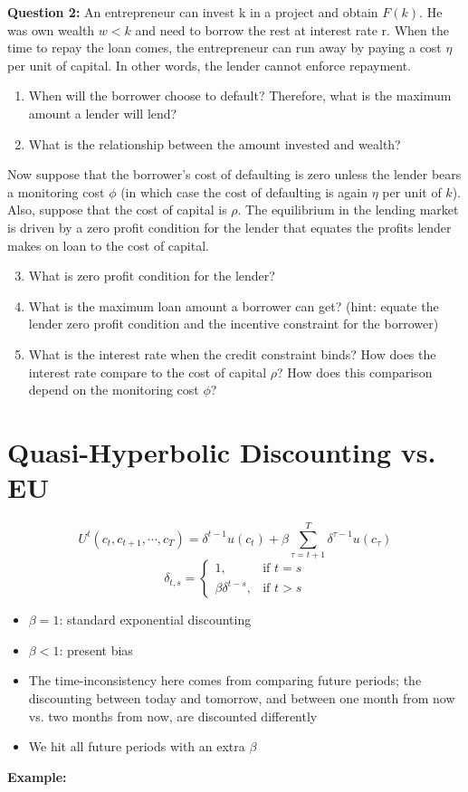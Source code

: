 \documentclass[a4paper]{article}
\begin{document}
\textbf{Question 2:} An entrepreneur can invest k in a project and obtain $F(k)$. He was own wealth $w<k$ and need to borrow the rest at interest rate r. When the time to repay the loan comes, the entrepreneur can run away by paying a cost $\eta$ per unit of capital. In other words, the lender cannot enforce repayment.
\begin{enumerate}
    \item When will the borrower choose to default? Therefore, what is the maximum amount a lender will lend?
    \item What is the relationship between the amount invested and wealth?
\end{enumerate}
Now suppose that the borrower’s cost of defaulting is zero unless the lender bears a monitoring cost $\phi$ (in which case the cost of defaulting is again $\eta$ per unit of $k$). Also, suppose that the cost of capital is $\rho$. The equilibrium in the lending market is driven by a zero profit condition for the lender that equates the profits lender makes on loan to the cost of capital.
\begin{enumerate}
    \setcounter{enumi}{2}
    \item What is zero profit condition for the lender?
    \item What is the maximum loan amount a borrower can get? (hint: equate the lender zero profit condition and the incentive constraint for the borrower)
    \item What is the interest rate when the credit constraint binds? How does the interest rate compare to the cost of capital $\rho$? How does this comparison depend on the monitoring cost $\phi$?
\end{enumerate}

\section{Quasi-Hyperbolic Discounting vs. EU}
\begin{equation*}
    U^t(c_t,c_{t+1},\cdots,c_T)=\delta^{t-1}u(c_t)+\beta\sum_{\tau=t+1}^{T}\delta^{\tau-1}u(c_{\tau})
\end{equation*}
\begin{equation*}
    \delta_{t,s}=
    \begin{cases}
    1, & \textrm{if } t=s \\
    \beta\delta^{t-s}, & \textrm{if } t>s
    \end{cases}
\end{equation*}
\begin{itemize}
    \item $\beta=1$: standard exponential discounting
    \item $\beta<1$: present bias
    \item The time-inconsistency here comes from comparing future periods; the discounting between today and tomorrow, and between one month from now vs. two months from now, are discounted differently
    \item We hit all future periods with an extra $\beta$
\end{itemize}
\textbf{Example:}
\end{document}
